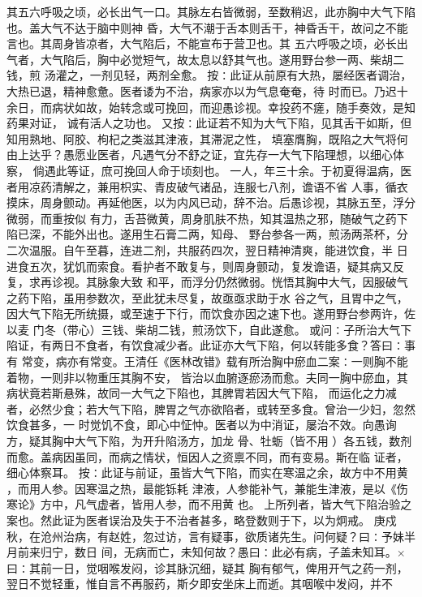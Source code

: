 \documentclass[a4paper,12pt,UTF8,twoside]{ctexbook}
\begin{document}
其五六呼吸之顷，必长出气一口。其脉左右皆微弱，至数稍迟，此亦胸中大气下陷也。盖大气不达于脑中则神 
昏，大气不潮于舌本则舌干，神昏舌干，故问之不能言也。其周身皆凉者，大气陷后，不能宣布于营卫也。其 
五六呼吸之顷，必长出气者，大气陷后，胸中必觉短气，故太息以舒其气也。遂用野台参一两、柴胡二钱，煎 
汤灌之，一剂见轻，两剂全愈。 
按∶此证从前原有大热，屡经医者调治，大热已退，精神愈惫。医者诿为不治，病家亦以为气息奄奄，待 
时而已。乃迟十余日，而病状如故，始转念或可挽回，而迎愚诊视。幸投药不瘥，随手奏效，是知药果对证， 
诚有活人之功也。 
又按∶此证若不知为大气下陷，见其舌干如斯，但知用熟地、阿胶、枸杞之类滋其津液，其滞泥之性， 
填塞膺胸，既陷之大气将何由上达乎？愚愿业医者，凡遇气分不舒之证，宜先存一大气下陷理想，以细心体察， 
倘遇此等证，庶可挽回人命于顷刻也。 
一人，年三十余。于初夏得温病，医者用凉药清解之，兼用枳实、青皮破气诸品，连服七八剂，谵语不省 
人事，循衣摸床，周身颤动。再延他医，以为内风已动，辞不治。后愚诊视，其脉五至，浮分微弱，而重按似 
有力，舌苔微黄，周身肌肤不热，知其温热之邪，随破气之药下陷已深，不能外出也。遂用生石膏二两，知母、 
野台参各一两，煎汤两茶杯，分二次温服。自午至暮，连进二剂，共服药四次，翌日精神清爽，能进饮食，半 
日进食五次，犹饥而索食。看护者不敢复与，则周身颤动，复发谵语，疑其病又反复，求再诊视。其脉象大致 
和平，而浮分仍然微弱。恍悟其胸中大气，因服破气之药下陷，虽用参数次，至此犹未尽复，故亟亟求助于水 
谷之气，且胃中之气，因大气下陷无所统摄，或至速于下行，而饮食亦因之速下也。遂用野台参两许，佐以麦 
门冬（带心）三钱、柴胡二钱，煎汤饮下，自此遂愈。 
或问∶子所治大气下陷证，有两日不食者，有饮食减少者。此证亦大气下陷，何以转能多食？答曰∶事有 
常变，病亦有常变。王清任《医林改错》载有所治胸中瘀血二案∶一则胸不能着物，一则非以物重压其胸不安， 
皆治以血腑逐瘀汤而愈。夫同一胸中瘀血，其病状竟若斯悬殊，故同一大气之下陷也，其脾胃若因大气下陷， 
而运化之力减者，必然少食；若大气下陷，脾胃之气亦欲陷者，或转至多食。曾治一少妇，忽然饮食甚多，一 
时觉饥不食，即心中怔忡。医者以为中消证，屡治不效。向愚询方，疑其胸中大气下陷，为开升陷汤方，加龙 
骨、牡蛎（皆不用 ）各五钱，数剂而愈。盖病因虽同，而病之情状，恒因人之资禀不同，而有变易。斯在临 
证者，细心体察耳。 
按∶此证与前证，虽皆大气下陷，而实在寒温之余，故方中不用黄 ，而用人参。因寒温之热，最能铄耗 
津液，人参能补气，兼能生津液，是以《伤寒论》方中，凡气虚者，皆用人参，而不用黄 也。 
上所列者，皆大气下陷治验之案也。然此证为医者误治及失于不治者甚多，略登数则于下，以为炯戒。 
庚戍秋，在沧州治病，有赵姓，忽过访，言有疑事，欲质诸先生。问何疑？曰∶予妹半月前来归宁，数日 
间，无病而亡，未知何故？愚曰∶此必有病，子盖未知耳。×曰∶其前一日，觉咽喉发闷，诊其脉沉细，疑其 
胸有郁气，俾用开气之药一剂，翌日不觉轻重，惟自言不再服药，斯夕即安坐床上而逝。其咽喉中发闷，并不 
\end{document}
